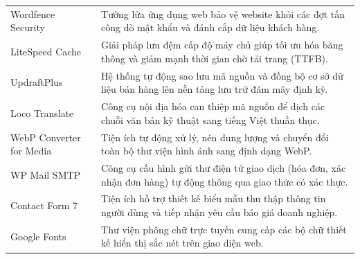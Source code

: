 \begin{longtable}{>{\raggedright\arraybackslash}p{4.5cm}>{\raggedright\arraybackslash}p{10.5cm}}
Wordfence Security \cite{plugin_wordfence} & Tường lửa ứng dụng web bảo vệ website khỏi các đợt tấn công dò mật khẩu và đánh cắp dữ liệu khách hàng. \\ \addlinespace
LiteSpeed Cache \cite{plugin_litespeed} & Giải pháp lưu đệm cấp độ máy chủ giúp tối ưu hóa băng thông và giảm mạnh thời gian chờ tải trang (TTFB). \\ \addlinespace
UpdraftPlus \cite{plugin_updraftplus} & Hệ thống tự động sao lưu mã nguồn và đồng bộ cơ sở dữ liệu bán hàng lên nền tảng lưu trữ đám mây định kỳ. \\ \addlinespace
Loco Translate \cite{plugin_loco_translate} & Công cụ nội địa hóa can thiệp mã nguồn để dịch các chuỗi văn bản kỹ thuật sang tiếng Việt thuần thục. \\ \addlinespace
WebP Converter for Media \cite{plugin_webp} & Tiện ích tự động xử lý, nén dung lượng và chuyển đổi toàn bộ thư viện hình ảnh sang định dạng WebP. \\ \addlinespace
WP Mail SMTP \cite{plugin_wp_mail_smtp} & Công cụ cấu hình gửi thư điện tử giao dịch (hóa đơn, xác nhận đơn hàng) tự động thông qua giao thức có xác thực. \\ \addlinespace
Contact Form 7 \cite{plugin_contact_form_7} & Tiện ích hỗ trợ thiết kế biểu mẫu thu thập thông tin người dùng và tiếp nhận yêu cầu báo giá doanh nghiệp. \\ \addlinespace
Google Fonts & Thư viện phông chữ trực tuyến cung cấp các bộ chữ thiết kế hiển thị sắc nét trên giao diện web. \\
\bottomrule
\end{longtable}
